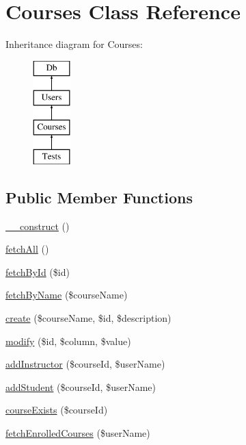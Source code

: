 \hypertarget{class_courses}{\section{Courses Class Reference}
\label{class_courses}
}
Inheritance diagram for Courses\-:\begin{figure}[H]
\begin{center}
\leavevmode
\includegraphics[height=4.000000cm]{class_courses}
\end{center}
\end{figure}
\subsection*{Public Member Functions}
\begin{DoxyCompactItemize}
\item 
\hyperlink{class_courses_a095c5d389db211932136b53f25f39685}{\-\_\-\-\_\-construct} ()
\item 
\hyperlink{class_courses_af008f367d5ca054454dacc1e8830d7fd}{fetch\-All} ()
\item 
\hyperlink{class_courses_a3e28346ce841ca962f8cd02bcf779f7e}{fetch\-By\-Id} (\$id)
\item 
\hyperlink{class_courses_a18c66bbad45c916eedc9dd9eaafdf2fe}{fetch\-By\-Name} (\$course\-Name)
\item 
\hyperlink{class_courses_a70e4ca7ed00c214b53247f1c58db0518}{create} (\$course\-Name, \$id, \$description)
\item 
\hyperlink{class_courses_a39bdae60b28491388b7526c4b2eefc7d}{modify} (\$id, \$column, \$value)
\item 
\hyperlink{class_courses_a523911d67549a199d2f019eec9cadf09}{add\-Instructor} (\$course\-Id, \$user\-Name)
\item 
\hyperlink{class_courses_a6704e97dc8543f819f8b1c14f4096ec0}{add\-Student} (\$course\-Id, \$user\-Name)
\item 
\hyperlink{class_courses_a180ac61277d5b0b6bb5d0d9c04b9ea1a}{course\-Exists} (\$course\-Id)
\item 
\hyperlink{class_courses_ade84f64416077da444e6fdda6d6f6265}{fetch\-Enrolled\-Courses} (\$user\-Name)
\end{DoxyCompactItemize}
